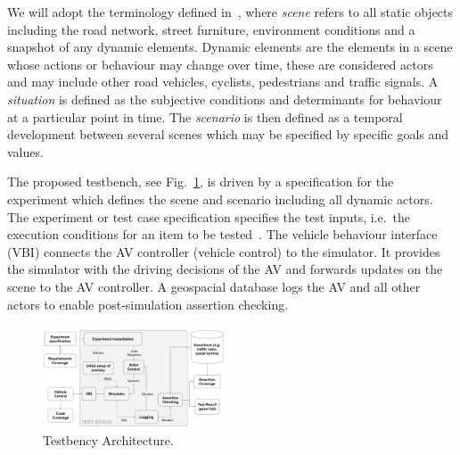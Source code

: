 \documentclass[letterpaper, 10 pt, journal, twoside]{IEEEtran}
\begin{document}
We will adopt the terminology defined in~\cite{Ulbrich2015}, where \textit{scene} refers to all static objects including the road network, street furniture, environment conditions and a snapshot of any dynamic elements. Dynamic elements are the elements in a scene whose actions or behaviour may change over time, these are considered actors and may include other road vehicles, cyclists, pedestrians and traffic signals. 
%
A \textit{situation} is defined as the subjective conditions and determinants for behaviour at a particular point in time. 
%
The \textit{scenario} is then defined as a temporal development between several scenes which may be specified by specific goals and values.

The proposed testbench, see Fig.~\ref{f:testbench}, is driven by a specification for the experiment which defines the scene and scenario including all dynamic actors. 
%
The experiment or test case specification specifies the test inputs, i.e.\ the execution conditions for an item to be tested~\cite{StandardsBoard1990}.
%
The vehicle behaviour interface (VBI) connects the AV controller (vehicle control) to the simulator. It provides the simulator with the driving decisions of the AV and forwards updates on the scene to the AV controller. 
%
A geospacial database logs the AV and all other actors to enable post-simulation assertion checking. 


\begin{figure}[!t]
	\centering
\includegraphics[width=0.48\textwidth]{TestBenchMonotone.pdf}
	\caption{Testbency Architecture.}
	\label{f:testbench}
\end{figure}
\end{document}
